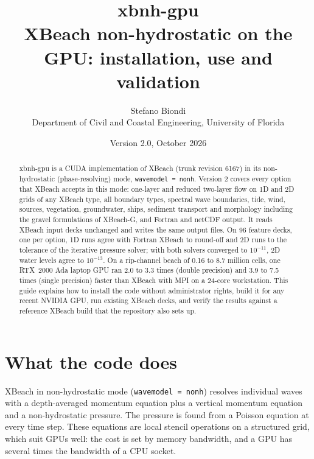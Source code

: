 \documentclass[11pt,a4paper]{article}
\title{\textbf{xbnh-gpu}\\[4pt]\large XBeach non-hydrostatic on the GPU: installation, use and validation}
\author{Stefano Biondi\\[2pt]\small Department of Civil and Coastal Engineering, University of Florida}
\date{Version 2.0, October 2026}
\newcommand{\code}[1]{\texttt{#1}}
\begin{document}
\sloppy
\maketitle

\begin{abstract}
\noindent xbnh-gpu is a CUDA implementation of XBeach (trunk revision 6167) in its non-hydrostatic
(phase-resolving) mode, \code{wavemodel = nonh}. Version 2 covers every option that XBeach accepts in this
mode: one-layer and reduced two-layer flow on 1D and 2D grids of any XBeach type, all boundary types,
spectral wave boundaries, tide, wind, sources, vegetation, groundwater, ships, sediment transport and
morphology including the gravel formulations of XBeach-G, and Fortran and netCDF output. It reads XBeach
input decks unchanged and writes the same output files. On 96 feature decks, one per option, 1D runs agree
with Fortran XBeach to round-off and 2D runs to the tolerance of the iterative pressure solver; with both
solvers converged to $10^{-11}$, 2D water levels agree to $10^{-13}$. On a rip-channel beach of 0.16 to 8.7
million cells, one RTX~2000 Ada laptop GPU ran 2.0 to 3.3 times (double precision) and 3.9 to 7.5 times
(single precision) faster than XBeach with MPI on a 24-core workstation. This guide explains how to install the code without
administrator rights, build it for any recent NVIDIA GPU, run existing XBeach decks, and verify the
results against a reference XBeach build that the repository also sets up.
\end{abstract}

\tableofcontents
\newpage

\section{What the code does}

XBeach in non-hydrostatic mode (\code{wavemodel = nonh}) resolves individual waves with a depth-averaged
momentum equation plus a vertical momentum equation and a non-hydrostatic pressure. The pressure is found
from a Poisson equation at every time step. These equations are local stencil operations on a structured
grid, which suit GPUs well: the cost is set by memory bandwidth, and a GPU has several times the bandwidth
of a CPU socket.
\end{document}
